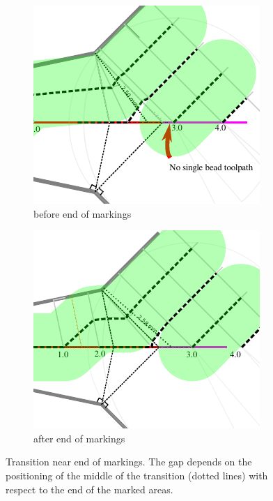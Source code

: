 \begin{figure}[H]
\begin{subfigure}{0.45\columnwidth}
\includegraphics[width=\columnwidth]{sources/method/change_to_marked.pdf}
\caption{before end of markings}
\end{subfigure}
\begin{subfigure}{0.45\columnwidth}
\includegraphics[width=\columnwidth]{sources/method/change_to_marked_2.pdf}
\caption{after end of markings}
\end{subfigure}
\caption{Transition near end of markings. The gap depends on the positioning of the middle of the transition (dotted lines) with respect to the end of the marked areas.}
\label{change_to_marked}
\end{figure}



